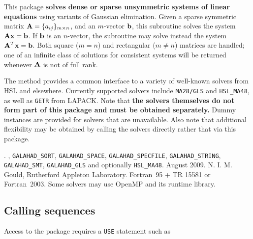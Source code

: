 \documentclass{galahad}
\newcommand{\packagename}{ULS}
\newcommand{\fullpackagename}{\libraryname\_\-\packagename}
\begin{document}
\galheader


\galsummary

This package
{\bf solves dense or sparse unsymmetric systems of linear equations}
using variants of Gaussian elimination.
Given a sparse symmetric matrix ${\mathbf{A}} = \{ a_{ij} \}_{m \times n}$, and an
$m$-vector ${\mathbf{b}}$, this subroutine solves the system ${\mathbf{A}} {\mathbf{x}} = {\mathbf{b}}$.
If ${\mathbf{b}}$ is an $n$-vector, the subroutine may solve instead the system
${\mathbf{A}}^T {\mathbf{x}} = {\mathbf{b}}$. Both square ($m=n$) and
rectangular ($m\neq n$)  matrices are handled; one of an infinite
class of  solutions for consistent systems will be returned
whenever ${\mathbf{A}}$ is not of full rank.

\noindent The method provides a common interface to a variety of well-known
solvers from HSL and elsewhere.
Currently supported solvers include
{\tt MA28/GLS} and {\tt HSL\_MA48},
as well as {\tt GETR} from LAPACK.
Note that
{\bf the solvers themselves do not form part of this package and must be obtained
separately.} Dummy instances are provided for solvers that are unavailable.
Also note that additional flexibility may be obtained by calling the
solvers directly rather that via this package.


\galattributes
\galversions{\tt  \fullpackagename\_single, \fullpackagename\_double}.
,
{\tt GALAHAD\_\-SORT},
{\tt GALAHAD\_SPACE},
{\tt GALAHAD\_SPECFILE},
{\tt GALAHAD\_STRING},
{\tt GALAHAD\_SMT},
{\tt GALAHAD\_GLS}
and optionally
{\tt HSL\_\-MA48}.
\galdate August 2009.
\galorigin N. I. M. Gould, Rutherford Appleton Laboratory.
\gallanguage Fortran~95 + TR 15581 or Fortran~2003.
\galparallelism Some solvers may use OpenMP and its runtime library.


\galhowto

\subsection{Calling sequences}

Access to the package requires a {\tt USE} statement such as
\end{document}
